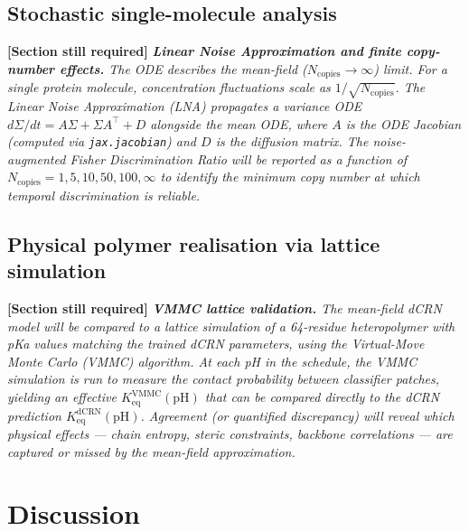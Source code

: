 \documentclass[10pt,twocolumn]{article}
\newcommand{\gap}[1]{%
  \begin{gapenv}
    \noindent\textcolor{gapred}{\textbf{[Section still required]}}\;
    \textcolor{gapred}{\textit{#1}}
  \end{gapenv}%
}
\begin{document}
\subsection{Stochastic single-molecule analysis}

\gap{%
  \textbf{Linear Noise Approximation and finite copy-number effects.}
  The ODE describes the mean-field ($N_\mathrm{copies} \to \infty$) limit.
  For a single protein molecule, concentration fluctuations scale as
  $1/\sqrt{N_\mathrm{copies}}$.
  The Linear Noise Approximation (LNA) propagates a variance ODE
  $d\Sigma/dt = A\Sigma + \Sigma A^\top + D$ alongside the mean ODE,
  where $A$ is the ODE Jacobian (computed via \texttt{jax.jacobian})
  and $D$ is the diffusion matrix.
  The noise-augmented Fisher Discrimination Ratio will be reported as a
  function of $N_\mathrm{copies} = 1, 5, 10, 50, 100, \infty$ to identify
  the minimum copy number at which temporal discrimination is reliable.
}

\subsection{Physical polymer realisation via lattice simulation}

\gap{%
  \textbf{VMMC lattice validation.}
  The mean-field dCRN model will be compared to a lattice simulation of
  a 64-residue heteropolymer with pKa values matching the trained dCRN
  parameters, using the Virtual-Move Monte Carlo (VMMC) algorithm.
  At each pH in the schedule, the VMMC simulation is run to measure
  the contact probability between classifier patches, yielding an
  effective $K_\mathrm{eq}^\mathrm{VMMC}(\mathrm{pH})$ that can be
  compared directly to the dCRN prediction $K_\mathrm{eq}^\mathrm{dCRN}(\mathrm{pH})$.
  Agreement (or quantified discrepancy) will reveal which physical
  effects — chain entropy, steric constraints, backbone correlations —
  are captured or missed by the mean-field approximation.
}

\section{Discussion}
\end{document}
